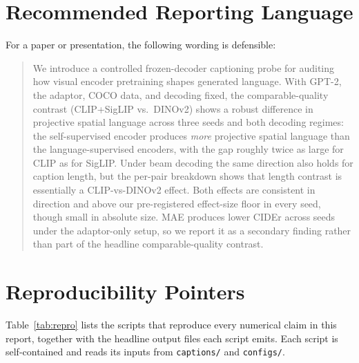 \documentclass[11pt]{article}
\newcommand{\code}[1]{\texttt{#1}}
\begin{document}
\section{Recommended Reporting Language}

For a paper or presentation, the following wording is defensible:

\begin{quote}
We introduce a controlled frozen-decoder captioning probe for auditing how
visual encoder pretraining shapes generated language. With GPT-2, the adaptor,
COCO data, and decoding fixed, the comparable-quality contrast
(CLIP+SigLIP vs.\ DINOv2) shows a robust difference in projective spatial
language across three seeds and both decoding regimes: the self-supervised
encoder produces \emph{more} projective spatial language than the
language-supervised encoders, with the gap roughly twice as large for CLIP as
for SigLIP. Under beam decoding the same direction also holds for caption
length, but the per-pair breakdown shows that length contrast is essentially
a CLIP-vs-DINOv2 effect. Both effects are consistent in direction and above
our pre-registered effect-size floor in every seed, though small in absolute
size. MAE produces lower CIDEr across seeds under the adaptor-only setup, so
we report it as a secondary finding rather than part of the headline
comparable-quality contrast.
\end{quote}

\appendix

\section{Reproducibility Pointers}

Table~\ref{tab:repro} lists the scripts that reproduce every numerical
claim in this report, together with the headline output files each script
emits. Each script is self-contained and reads its inputs from
\code{captions/} and \code{configs/}.
\end{document}
